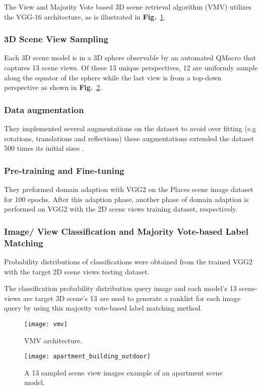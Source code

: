 \documentclass[../main.tex]{subfiles}
\begin{document}
	
The View and Majority Vote based 3D scene retrieval algorithm (VMV) utilizes the VGG-16 architecture, as is illustrated in \textbf{Fig.}~\ref{SHREC19}. 

\subsubsection{3D Scene View Sampling}
Each 3D scene model is in a 3D sphere observable by an automated QMacro that captures 13 scene views. Of these 13 unique perspectives, 12 are uniformly sample along the equator of the sphere while the last view is from a top-down perspective as shown in \textbf{Fig.}~\ref{apartment_building_outdoor}.


\subsubsection{Data augmentation}
They implemented several augmentations on the dataset to avoid over fitting (e.g rotations, translations and reflections) these augmentations extended the dataset 500 times its initial sizes \cite{3DICPR}. 


\subsubsection{Pre-training and Fine-tuning}   
They preformed domain adaption with VGG2 on the Places scene image dataset \cite{zhou2017places} for 100 epochs. After this adaption phase, another phase of domain adaption is performed on VGG2 with the 2D scene views training dataset, respectively.

\subsubsection{Image/ View Classification and Majority Vote-based Label Matching}
Probability distributions of classifications were obtained from the trained VGG2 with the target 2D scene views testing dataset. 


The classification probability distribution query image and each model's 13 scene-views are target 3D scene's 13 are used to generate a ranklist for each image query by using this majority vote-based label matching method.

\begin{figure}[!htp]
\centering
{
\texttt{[image: vmv]}
}
\caption{VMV architecture.}
\label{SHREC19}
\end{figure}

\begin{figure}[!htp]
\centering
{
\texttt{[image: apartment\_building\_outdoor]}
}
\caption{A 13 sampled scene view images example of an apartment scene model.}
\label{apartment_building_outdoor}
\end{figure}
\end{document}
